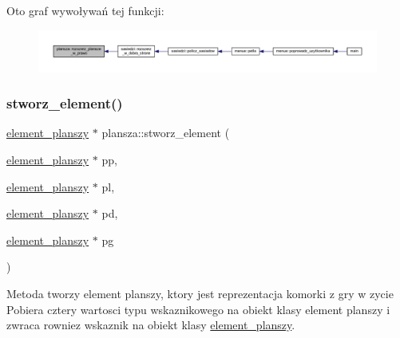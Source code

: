 Oto graf wywoływań tej funkcji\+:
\nopagebreak
\begin{figure}[H]
\begin{center}
\leavevmode
\includegraphics[width=350pt]{classplansza_a50024fced2d5f43220cee76e77e54882_icgraph}
\end{center}
\end{figure}
\mbox{\label{classplansza_ab58b287ec128257badf582e1ce7ea11e}} 
\subsubsection{\texorpdfstring{stworz\+\_\+element()}{stworz\_element()}}
{\footnotesize\ttfamily \mbox{\hyperlink{classelement__planszy}{element\+\_\+planszy}} $\ast$ plansza\+::stworz\+\_\+element (\begin{DoxyParamCaption}\item[{\mbox{\hyperlink{classelement__planszy}{element\+\_\+planszy}} $\ast$}]{pp,  }\item[{\mbox{\hyperlink{classelement__planszy}{element\+\_\+planszy}} $\ast$}]{pl,  }\item[{\mbox{\hyperlink{classelement__planszy}{element\+\_\+planszy}} $\ast$}]{pd,  }\item[{\mbox{\hyperlink{classelement__planszy}{element\+\_\+planszy}} $\ast$}]{pg }\end{DoxyParamCaption})}

Metoda tworzy element planszy, ktory jest reprezentacja komorki z gry w zycie Pobiera cztery wartosci typu wskaznikowego na obiekt klasy element planszy i zwraca rowniez wskaznik na obiekt klasy \mbox{\hyperlink{classelement__planszy}{element\+\_\+planszy}}.

